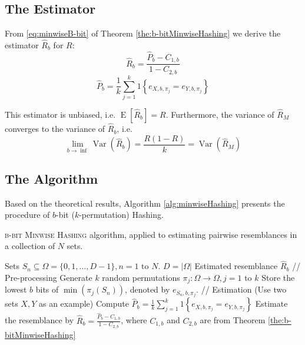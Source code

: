 \documentclass[a4paper]{article}
\DeclareMathOperator{\Var}{Var}
\DeclareMathOperator{\E}{E}
\begin{document}
\subsection{The Estimator}

From \vref{eq:minwiseB-bit} of Theorem \vref{the:b-bitMinwiseHashing} we derive the estimator $\hat{R}_b$ for $R$:
\begin{equation}
\hat{R}_b=\frac{\hat{P}_b-C_{1,b}}{1-C_{2,b}}
\end{equation}
\begin{equation}
\hat{P}_b = \frac{1}{k}\sum_{j=1}^k 1 \left\lbrace  e_{X,b,\pi_j } = e_{Y,b,\pi_j } \right\rbrace
\end{equation}

This estimator is unbiased, i.e. $\E[\hat{R}_b]=R$. Furthermore, the variance of $\hat{R}_M$ converges to the variance of $\hat{R}_b$, i.e.
\begin{equation}
\lim_{b\rightarrow\inf}\Var\left(\hat{R}_b\right)=\frac{R(1-R)}{k}=\Var\left(\hat{R}_M\right)
\end{equation}

\subsection{The Algorithm}

Based on the theoretical results, Algorithm \vref{alg:minwiseHashing} presents the procedure of $b$-bit ($k$-permutation) Hashing.

\begin{algorithm}[H]
\caption{\textsc{b-bit Minwise Hashing} algorithm, applied to estimating pairwise resemblances in a collection of $N$ sets.}
\label{alg:minwiseHashing}
\begin{algorithmic}
\Require Sets $S_n \subseteq \Omega = \{0,1,\ldots,D-1\}, n = 1 \text{ to } N$. \Comment $D = \left| \Omega \right|$
\Ensure Estimated resemblance $\hat{R}_b$
\State // Pre-processing
\State Generate $k$ random permutations $\pi_j: \Omega\longrightarrow\Omega, j=1\text{ to }k$
	\State Store the lowest $b$ bits of $\min(\pi_j(S_n))$, denoted by $e_{S_n,b,\pi_j}$.
\EndFor
\State
\State // Estimation (Use two sets $X,Y$ as an example)
\State Compute $\hat{P}_b = \frac{1}{k}\sum_{j=1}^k 1 \left\lbrace  e_{X,b,\pi_j } = e_{Y,b,\pi_j } \right\rbrace$
\State Estimate the resemblance by $\hat{R}_b = \frac{\hat{P}_b-C_{1,b}}{1-C_{2,b}}$, where $C_{1,b}$ and $C_{2,b}$ are from Theorem \vref{the:b-bitMinwiseHashing}
\end{algorithmic}
\end{algorithm}
\end{document}
